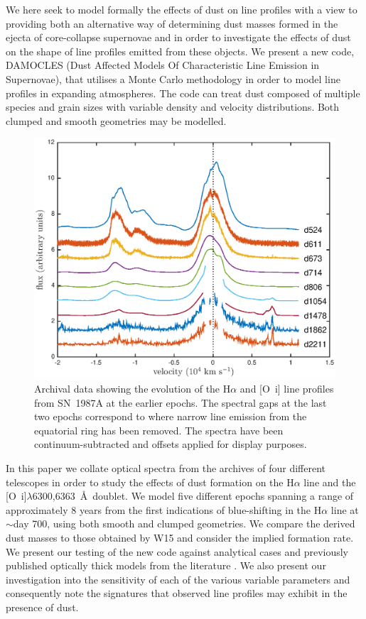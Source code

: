 \documentclass[useAMS,usenatbib,usegraphicx]{mnras}
\begin{document}
We here seek to model formally the effects of dust on line profiles with a 
view to providing both an alternative way of determining dust 
masses formed in the ejecta of core-collapse supernovae and in order to investigate 
the  effects of dust on the shape of line profiles emitted from 
these objects.  We present a new code, DAMOCLES (Dust Affected Models Of 
Characteristic Line Emission in Supernovae), that utilises a Monte Carlo 
methodology in order to  model line profiles in expanding 
atmospheres.  The code can treat dust composed of multiple species 
and grain sizes with variable density and velocity distributions.  Both 
clumped and smooth geometries may be modelled.

\begin{figure}
\includegraphics[trim =39 10 45 15,clip=true,scale=0.51]{Ha_evol_early_1col2}
\caption{Archival data showing the evolution of the H$\alpha$ and
[O~{\sc i}] line profiles from SN~1987A at the earlier epochs. The 
spectral gaps at the last two epochs correspond to where narrow line 
emission from the equatorial ring has been removed. The spectra have been
continuum-subtracted and offsets applied for display purposes.}
\label{Ha_evol_early}
\end{figure}

In this paper we collate optical spectra from the archives of four 
different telescopes in order to study the effects of dust formation on 
the H$\alpha$ line and the [O~{\sc i}]$\lambda$6300,6363~\AA\ doublet.  
We model five different epochs spanning a range of approximately 8 years 
from the first indications of blue-shifting in the H$\alpha$ line at 
$\sim$day 700, using both smooth and clumped geometries.  We compare the 
derived dust masses to those obtained by W15 and consider the implied 
formation rate.  We present our testing of the new code against 
analytical cases and previously published optically thick models from 
the literature \citep{Lucy1989}. We also present our investigation into 
the sensitivity of each of the various variable parameters and 
consequently note the signatures that observed line profiles may exhibit 
in the presence of dust.
\end{document}
